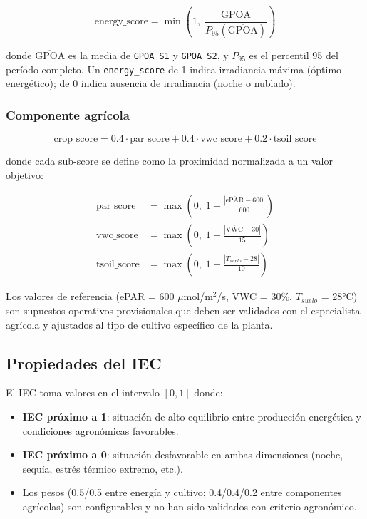 \documentclass[12pt,a4paper]{article}
\begin{document}
\begin{equation}
    \text{energy\_score} = \min\!\left(1,\; \frac{\overline{\text{GPOA}}}{P_{95}(\overline{\text{GPOA}})}\right)
\end{equation}

donde $\overline{\text{GPOA}}$ es la media de \texttt{GPOA\_S1} y \texttt{GPOA\_S2},
y $P_{95}$ es el percentil 95 del período completo. Un \texttt{energy\_score} de 1
indica irradiancia máxima (óptimo energético); de 0 indica ausencia de irradiancia
(noche o nublado).

\subsubsection{Componente agrícola}

\begin{equation}
    \text{crop\_score} = 0.4 \cdot \text{par\_score} + 0.4 \cdot \text{vwc\_score} + 0.2 \cdot \text{tsoil\_score}
\end{equation}

donde cada sub-score se define como la proximidad normalizada a un valor objetivo:

\begin{align}
    \text{par\_score}   &= \max\!\left(0,\; 1 - \frac{|\overline{\text{ePAR}} - 600|}{600}\right) \\[4pt]
    \text{vwc\_score}   &= \max\!\left(0,\; 1 - \frac{|\overline{\text{VWC}} - 30|}{15}\right) \\[4pt]
    \text{tsoil\_score} &= \max\!\left(0,\; 1 - \frac{|\overline{T_{suelo}} - 28|}{10}\right)
\end{align}

Los valores de referencia (ePAR = 600 $\mu$mol/m$^2$/s, VWC = 30\%, $T_{suelo}$ = 28°C)
son supuestos operativos provisionales que deben ser validados con el especialista
agrícola y ajustados al tipo de cultivo específico de la planta.

\subsection{Propiedades del IEC}

El IEC toma valores en el intervalo $[0, 1]$ donde:
\begin{itemize}[noitemsep]
    \item \textbf{IEC próximo a 1}: situación de alto equilibrio entre producción
        energética y condiciones agronómicas favorables.
    \item \textbf{IEC próximo a 0}: situación desfavorable en ambas dimensiones
        (noche, sequía, estrés térmico extremo, etc.).
    \item Los pesos (0.5/0.5 entre energía y cultivo; 0.4/0.4/0.2 entre componentes
        agrícolas) son configurables y no han sido validados con criterio agronómico.
\end{itemize}
\end{document}
